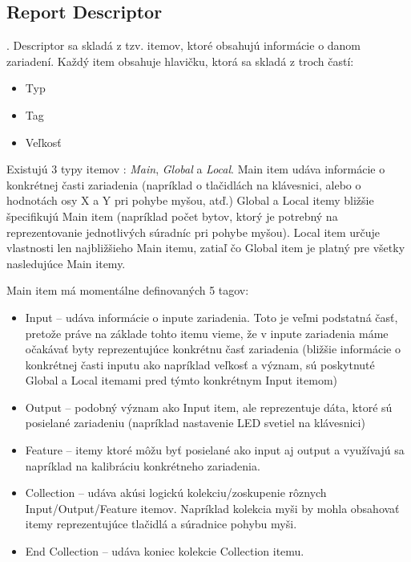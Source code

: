 \subsection*{Report Descriptor}
\label{kap03:sec:report_desc}
. Descriptor sa skladá z tzv. itemov, ktoré obsahujú informácie o danom zariadení. Každý item obsahuje hlavičku, ktorá sa skladá z troch častí:
\begin{itemize}
\item Typ
\item Tag
\item Veľkosť
\end{itemize}

Existujú 3 typy itemov : \textit{Main}, \textit{Global} a \textit{Local}. Main item udáva informácie o konkrétnej časti zariadenia (napríklad o tlačidlách na klávesnici, alebo o hodnotách osy X a Y pri pohybe myšou, atď.) Global a Local itemy bližšie špecifikujú Main item (napríklad počet bytov, ktorý je potrebný na reprezentovanie jednotlivých súradníc pri pohybe myšou). Local item určuje vlastnosti len najbližšieho Main itemu, zatiaľ čo Global item je platný pre všetky nasledujúce Main itemy.

Main item má momentálne definovaných 5 tagov:
\begin{itemize}
\item Input -- udáva informácie o inpute zariadenia. Toto je veľmi podstatná časť, pretože práve na základe tohto itemu vieme, že v inpute zariadenia máme očakávať byty reprezentujúce konkrétnu časť zariadenia (bližšie informácie o konkrétnej časti inputu ako napríklad veľkosť a význam, sú poskytnuté Global a Local itemami pred týmto konkrétnym Input itemom)
\item Output -- podobný význam ako Input item, ale reprezentuje dáta, ktoré sú posielané zariadeniu (napríklad nastavenie LED svetiel na klávesnici)
\item Feature -- itemy ktoré môžu byť posielané ako input aj output a využívajú sa napríklad na kalibráciu konkrétneho zariadenia.
\item Collection -- udáva akúsi logickú kolekciu/zoskupenie rôznych Input/Out\-put/Feature itemov. Napríklad kolekcia myši by mohla obsahovať itemy reprezentujúce tlačidlá a súradnice pohybu myši.
\item End Collection -- udáva koniec kolekcie Collection itemu.
\end{itemize}

